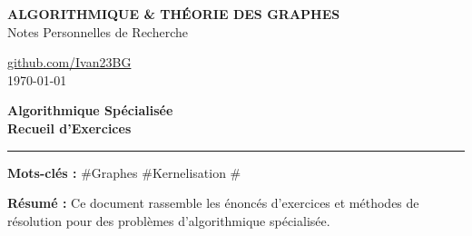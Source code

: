 \begin{titlepage}
    \pagecolor{bgcolor}
    \color{textcolor}
    
    \begin{minipage}[t]{0.65\textwidth}
        \raggedright\strut
        {\small\bfseries\color{exocolor} ALGORITHMIQUE \& THÉORIE DES GRAPHES}\\[2pt]
        {\small\color{fallbackcolor} Notes Personnelles de Recherche}
    \end{minipage}%
    \hfill
    \begin{minipage}[t]{0.3\textwidth}
        \raggedleft\strut
        {\small 
            \href{https://github.com/Ivan23BG/cours-graphes}{\color{fallbackcolor}github.com/Ivan23BG}\\[2pt]
            \color{fallbackcolor}\today
        }
    \end{minipage}

    \vfill

    \begin{tcolorbox}[
        enhanced,
        colback=boxbg,
        colframe=exocolor,
        boxrule=0pt,
        leftrule=4pt,
        arc=0mm,
        top=16pt, bottom=16pt, left=18pt, right=18pt
    ]
        {\Huge\bfseries\color{textcolor} Algorithmique Spécialisée}\\[6pt] %
        {\large\color{exocolor}\bfseries Recueil d'Exercices}
        
        \vspace{10pt}
        \color{textcolor}\rule{\textwidth}{0.4pt}
        \vspace{8pt}

        {\small
        \textbf{Mots-clés :} \#Graphes \quad \#Kernelisation \quad \#
        }
    \end{tcolorbox}

    \vfill

    

    \vfill

    \begin{tcolorbox}[
        blanker,
        left=12pt,
        borderline west={1.5pt}{0pt}{fallbackcolor}
    ]
        {\small\color{fallbackcolor}
        \textbf{Résumé :} Ce document rassemble les énoncés d'exercices et méthodes de résolution pour des problèmes d'algorithmique spécialisée.
        } %
    \end{tcolorbox}


\end{titlepage}
